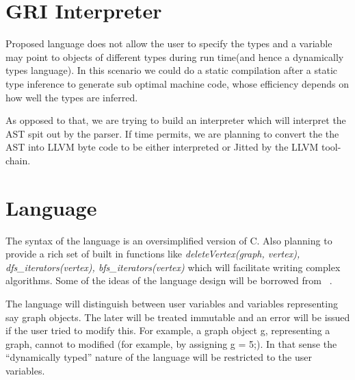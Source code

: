\documentclass[12,twoside]{article}
\begin{document}
\section{GRI Interpreter}
 
Proposed language does not allow the user to specify the types and a variable
  may point to objects of different types during run time(and hence a
      dynamically types language). In this scenario we could do a static
  compilation after a static type inference to generate sub optimal machine
  code, whose efficiency depends on how well the types are inferred.

  As opposed to that,  we are trying to build an interpreter which will
  interpret the AST spit out by the parser.  If time permits, we are planning
  to convert the the AST into LLVM byte code to be either interpreted or Jitted
  by the LLVM tool-chain.

\section{Language}

The syntax of the language is an oversimplified version  of C.  Also planning
  to provide a rich set of built in functions like \emph{deleteVertex(graph, vertex),
  dfs\_iterators(vertex), bfs\_iterators(vertex)} which will facilitate writing complex
      algorithms. Some of the ideas of the language design will be borrowed
      from ~\cite{Graphal}.

  The language will distinguish between user variables and variables
  representing say graph objects. The later will be treated immutable and an
  error will be issued if the user tried to modify this. For example, a graph
  object g, representing a graph, cannot to modified (for example, by assigning
      g = 5;).  In that sense the ``dynamically typed'' nature of the language
  will be restricted to the user variables.




\end{document}
